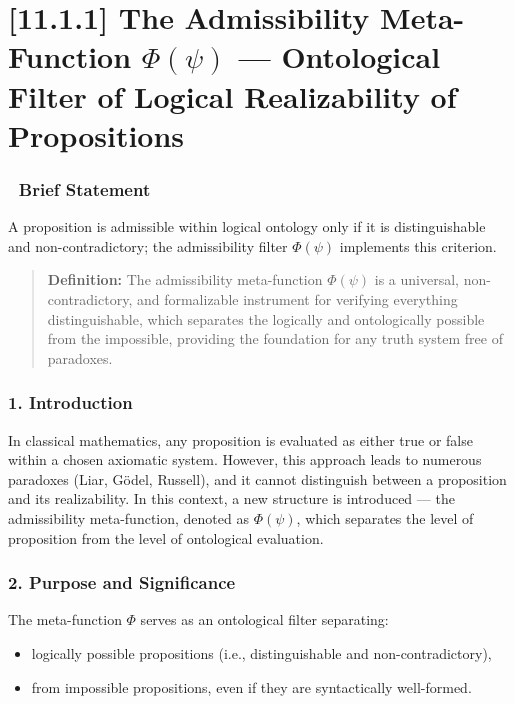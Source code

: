\documentclass[12pt]{article}
\begin{document}
\section*{[11.1.1] The Admissibility Meta-Function $\Phi(\psi)$ — Ontological Filter of Logical Realizability of Propositions}

\subsubsection*{🔹 Brief Statement}

A proposition is admissible within logical ontology only if it is distinguishable and non-contradictory; the admissibility filter $\Phi(\psi)$ implements this criterion.

\begin{quote}
\textbf{Definition:}
The admissibility meta-function $\Phi(\psi)$ is a universal, non-contradictory, and formalizable instrument for verifying everything distinguishable, which separates the logically and ontologically possible from the impossible, providing the foundation for any truth system free of paradoxes.
\end{quote}

\subsubsection*{1. Introduction}

In classical mathematics, any proposition is evaluated as either true or false within a chosen axiomatic system. However, this approach leads to numerous paradoxes (Liar, Gödel, Russell), and it cannot distinguish between a proposition and its realizability. In this context, a new structure is introduced — the admissibility meta-function, denoted as $\Phi(\psi)$, which separates the level of proposition from the level of ontological evaluation.

\subsubsection*{2. Purpose and Significance}

The meta-function $\Phi$ serves as an ontological filter separating:
\begin{itemize}
\item logically possible propositions (i.e., distinguishable and non-contradictory),
\item from impossible propositions, even if they are syntactically well-formed.
\end{itemize}
\end{document}
